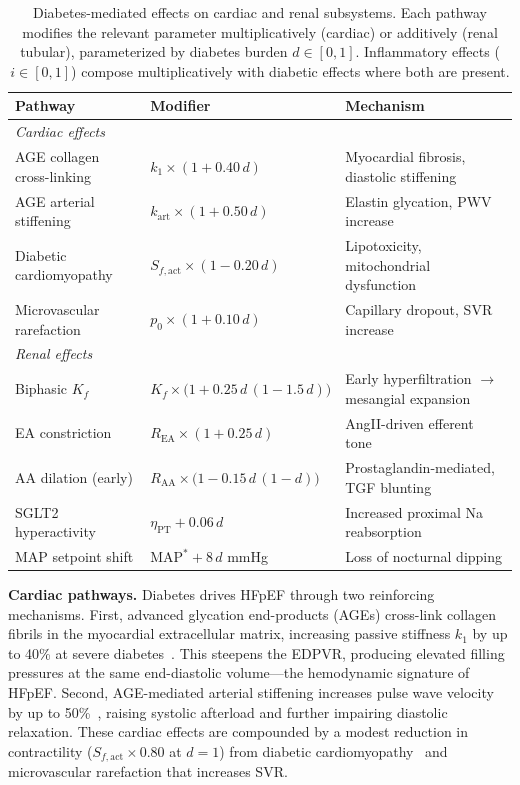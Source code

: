 \documentclass[pmlr]{jmlr}
\begin{document}
\begin{table}[t]
\centering
\caption{Diabetes-mediated effects on cardiac and renal subsystems. Each pathway modifies the relevant parameter multiplicatively (cardiac) or additively (renal tubular), parameterized by diabetes burden $d \in [0,1]$. Inflammatory effects ($i \in [0,1]$) compose multiplicatively with diabetic effects where both are present.}
\label{tab:diabetes}
\small
\begin{tabular}{p{3.2cm}p{3.5cm}p{4.5cm}}
\toprule
\textbf{Pathway} & \textbf{Modifier} & \textbf{Mechanism} \\
\midrule
\multicolumn{3}{l}{\emph{Cardiac effects}} \\[2pt]
AGE collagen cross-linking & $k_1 \times (1 + 0.40\,d)$ & Myocardial fibrosis, diastolic stiffening~\citep{vanheerebeek2008} \\
AGE arterial stiffening & $k_{\text{art}} \times (1 + 0.50\,d)$ & Elastin glycation, PWV increase~\citep{prenner2015} \\
Diabetic cardiomyopathy & $S_{f,\text{act}} \times (1 - 0.20\,d)$ & Lipotoxicity, mitochondrial dysfunction~\citep{bugger2014} \\
Microvascular rarefaction & $p_0 \times (1 + 0.10\,d)$ & Capillary dropout, SVR increase \\[4pt]
\multicolumn{3}{l}{\emph{Renal effects}} \\[2pt]
Biphasic $K_f$ & $K_f \times \bigl(1 + 0.25\,d\,(1 - 1.5\,d)\bigr)$ & Early hyperfiltration $\to$ mesangial expansion~\citep{brenner1996} \\
EA constriction & $R_{\text{EA}} \times (1 + 0.25\,d)$ & AngII-driven efferent tone~\citep{brenner1996} \\
AA dilation (early) & $R_{\text{AA}} \times \bigl(1 - 0.15\,d\,(1-d)\bigr)$ & Prostaglandin-mediated, TGF blunting~\citep{vallon2003} \\
SGLT2 hyperactivity & $\eta_{\text{PT}} + 0.06\,d$ & Increased proximal Na reabsorption~\citep{thomson2004} \\
MAP setpoint shift & $\text{MAP}^* + 8\,d$ mmHg & Loss of nocturnal dipping \\
\bottomrule
\end{tabular}
\end{table}

\textbf{Cardiac pathways.} Diabetes drives HFpEF through two reinforcing mechanisms. First, advanced glycation end-products (AGEs) cross-link collagen fibrils in the myocardial extracellular matrix, increasing passive stiffness $k_1$ by up to 40\% at severe diabetes~\citep{vanheerebeek2008}. This steepens the EDPVR, producing elevated filling pressures at the same end-diastolic volume---the hemodynamic signature of HFpEF. Second, AGE-mediated arterial stiffening increases pulse wave velocity by up to 50\%~\citep{prenner2015}, raising systolic afterload and further impairing diastolic relaxation. These cardiac effects are compounded by a modest reduction in contractility ($S_{f,\text{act}} \times 0.80$ at $d=1$) from diabetic cardiomyopathy~\citep{bugger2014} and microvascular rarefaction that increases SVR.
\end{document}
